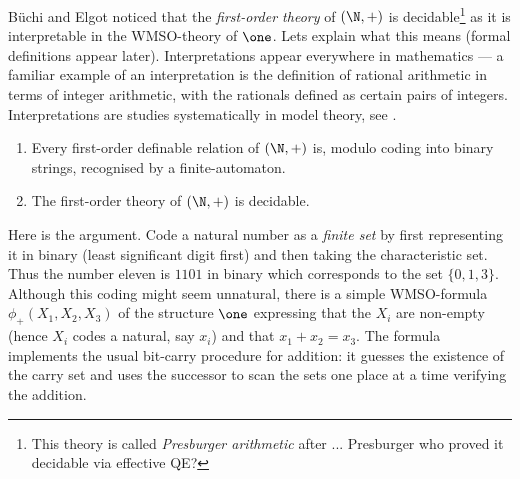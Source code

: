 B\"uchi and Elgot noticed that the {\it first-order theory} of $(\N,+)$ is
decidable\footnote{This theory is called \emph{Presburger arithmetic} after ...
Presburger who proved it decidable via effective QE?} as it is interpretable in
the WMSO-theory of $\one$. Lets explain what this means (formal definitions
appear later).
Interpretations appear everywhere
in mathematics --- a familiar example of an interpretation is the definition of
rational arithmetic in terms of integer arithmetic, with the rationals defined
as certain pairs of integers. Interpretations are studies systematically in
model theory, see \cite{}.

\begin{corollary} \label{AS:cor:PRES}
\begin{enumerate}
\item Every first-order definable relation of $(\N,+)$ is, modulo coding into binary strings, recognised by a finite-automaton.

\item The first-order theory of $(\N,+)$ is decidable.
\end{enumerate}
\end{corollary}

Here is the argument.
Code a natural number as a \emph{finite set} by first
representing it in binary (least significant digit first) and then taking the
characteristic set. Thus the number eleven is $1101$ in binary which corresponds
to the set $\{0,1,3\}$. Although this coding might seem unnatural, there is a
simple WMSO-formula $\phi_+(X_1,X_2,X_3)$ of the structure $\one$ expressing that the $X_i$ are non-empty (hence $X_i$ codes a natural, say $x_i$) 
and that $x_1 + x_2 = x_3$. The formula implements the usual bit-carry procedure for addition:
it guesses the existence of the carry set and uses the successor to scan the
sets one place at a time verifying the addition. 

